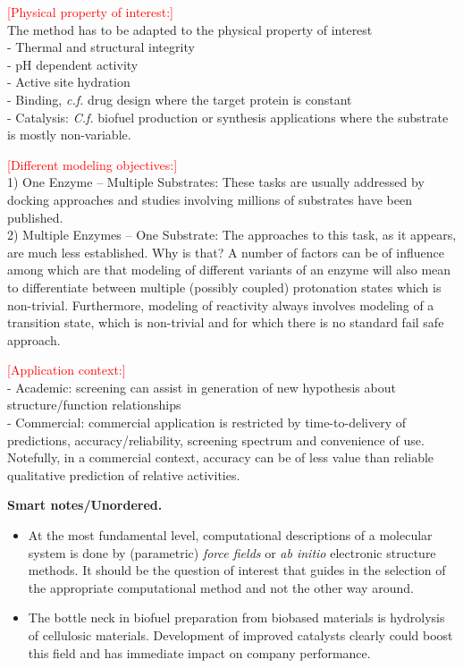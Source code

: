\noindent\textcolor{red}{[Physical property of interest:]}\\
The method has to be adapted to the physical property of interest\\
- Thermal and structural integrity\\
- pH dependent activity\cite{ludwiczek2013strategies}\\
- Active site hydration\\
- Binding, \textit{c.f.} drug design where the target protein is constant\\
- Catalysis: \textit{C.f.} biofuel production or synthesis applications where the substrate is mostly non-variable.

\noindent\textcolor{red}{[Different modeling objectives:]}\\
1) One Enzyme -- Multiple Substrates:
These tasks are usually addressed by docking approaches and studies involving millions of substrates have been published\cite{zhou2010high}.\\
2) Multiple Enzymes -- One Substrate:
The approaches to this task, as it appears, are much less established.
Why is that?
A number of factors can be of influence among which are that modeling of different variants of an enzyme will also mean to differentiate between multiple (possibly coupled) protonation states which is non-trivial.
Furthermore, modeling of reactivity always involves modeling of a transition state, which is non-trivial and for which there is no standard fail safe approach.

\noindent\textcolor{red}{[Application context:]}\\
- Academic: screening can assist in generation of new hypothesis about structure/function relationships\\
- Commercial: commercial application is restricted by time-to-delivery of predictions, accuracy/reliability, screening spectrum and convenience of use.
Notefully, in a commercial context, accuracy can be of less value than reliable qualitative prediction of relative activities.


\textbf{Smart notes/Unordered.}
\begin{itemize}
\item At the most fundamental level, computational descriptions of a molecular system is done by (parametric) \textit{force fields} or \textit{ab initio} electronic structure methods.
It should be the question of interest that guides in the selection of the appropriate computational method and not the other way around.\\
\item The bottle neck in biofuel preparation from biobased materials is hydrolysis of cellulosic materials. Development of improved catalysts clearly could boost this field and has immediate impact on company performance.
\end{itemize}




